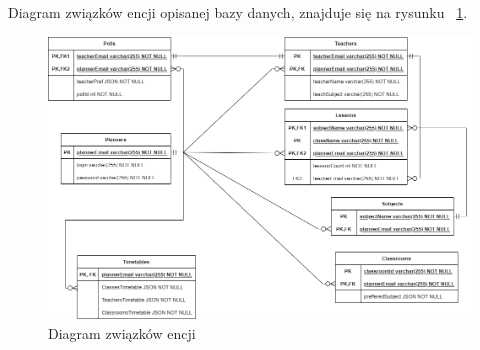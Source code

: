 Diagram związków encji opisanej bazy danych, znajduje się na rysunku ~\ref{rys:sqldiag}.

\begin{figure}[H]
	\centering\includegraphics[width=\textwidth]{figures/SQLdiag}
	\caption{Diagram związków encji}\label{rys:sqldiag}
\end{figure}